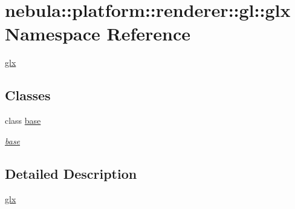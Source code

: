 \hypertarget{namespacenebula_1_1platform_1_1renderer_1_1gl_1_1glx}{
\section{nebula::platform::renderer::gl::glx Namespace Reference}
\label{namespacenebula_1_1platform_1_1renderer_1_1gl_1_1glx}
}


\hyperlink{namespacenebula_1_1platform_1_1renderer_1_1gl_1_1glx}{glx}  
\subsection*{Classes}
\begin{DoxyCompactItemize}
\item 
class \hyperlink{classnebula_1_1platform_1_1renderer_1_1gl_1_1glx_1_1base}{base}
\begin{DoxyCompactList}\small\item\em \hyperlink{classnebula_1_1platform_1_1renderer_1_1gl_1_1glx_1_1base}{base} \item\end{DoxyCompactList}\end{DoxyCompactItemize}


\subsection{Detailed Description}
\hyperlink{namespacenebula_1_1platform_1_1renderer_1_1gl_1_1glx}{glx} 